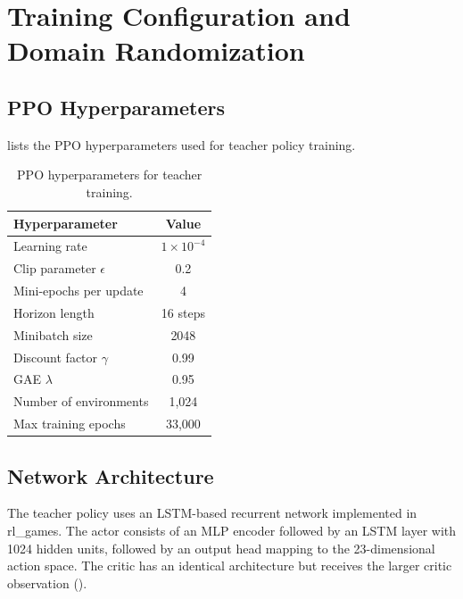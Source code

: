 \chapter{Training Configuration and Domain Randomization}%
\label{app:training_config}%

\section{PPO Hyperparameters}%
\label{app:ppo_hyperparams}%

 lists the \ac{PPO} hyperparameters used for teacher policy training.

\begin{table}[htb]
    \centering
    \caption{PPO hyperparameters for teacher training.}
    \label{tab:ppo_hyperparams}
    \begin{tabular}{lc}
        \toprule
        \textbf{Hyperparameter} & \textbf{Value} \\
        \midrule
        Learning rate & $1 \times 10^{-4}$ \\
        Clip parameter $\epsilon$ & 0.2 \\
        Mini-epochs per update & 4 \\
        Horizon length & 16 steps \\
        Minibatch size & 2048 \\
        Discount factor $\gamma$ & 0.99 \\
        GAE $\lambda$ & 0.95 \\
        Number of environments & 1{,}024 \\
        Max training epochs & 33{,}000 \\
        \bottomrule
    \end{tabular}
\end{table}

\section{Network Architecture}%
\label{app:network_architecture}%

The teacher policy uses an \ac{LSTM}-based recurrent network implemented in rl\_games.
The actor consists of an MLP encoder followed by an LSTM layer with 1024 hidden units, followed by an output head mapping to the 23-dimensional action space.
The critic has an identical architecture but receives the larger critic observation ().

